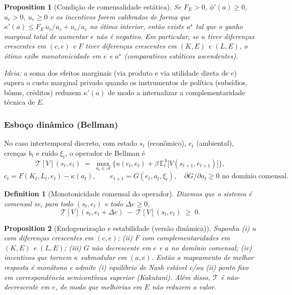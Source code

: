 \documentclass[a4paper,12pt,oneside,brazil,english]{abntex2}
\newtheorem{definition}{Definition}[section]
\newtheorem{proposition}{Proposition}[section]
\begin{document}
\begin{proposition}[Condição de comensalidade estática]
Se $F_E>0$, $\phi'(a)\ge 0$, $u_c>0$, $u_e\ge 0$ e os incentivos forem calibrados de forma que $\kappa'(a)\le F_E\,u_c/u_c + u_e/u_c$ no ótimo interior, então existe $a^\star$ tal que o ganho marginal total de aumentar $e$ não é negativo. Em particular, se $u$ tiver diferenças crescentes em $(c,e)$ e $F$ tiver diferenças crescentes em $(K,E)$ e $(L,E)$, o ótimo exibe \emph{monotonicidade} em $e$ e $a^\star$ (comparativos estáticos ascendentes).
\end{proposition}

\noindent
\textit{Ideia:} a soma dos efeitos marginais (via produto e via utilidade direta de $e$) supera o custo marginal privado quando os instrumentos de política (subsídios, bônus, créditos) reduzem $\kappa'(a)$ de modo a internalizar a complementaridade técnica de $E$.

\subsubsection*{Esboço dinâmico (Bellman)}

No caso intertemporal discreto, com estado $s_t$ (econômico), $e_t$ (ambiental), crenças $b_t$ e ruído $\xi_t$, o operador de Bellman é
\[
\mathcal{T}[V](s_t,e_t) \;=\; \max_{a_t\in\mathcal{A}} \Big\{ u(c_t,e_t) + \beta\,\mathbb{E}_{t}^{\,b}\big[V(s_{t+1},e_{t+1})\big] \Big\},
\]
\[
c_t=F(K_t,L_t,e_t)-\kappa(a_t),\qquad e_{t+1}=G(e_t,a_t,\xi_t),\quad \partial G/\partial a_t \ge 0 \text{ no domínio comensal}.
\]

\begin{definition}[Monotonicidade comensal do operador]
Dizemos que o sistema é \emph{comensal} se, para todo $(s_t,e_t)$ e todo $\Delta e\ge 0$,
\[
\mathcal{T}[V](s_t,e_t+\Delta e)\;-\;\mathcal{T}[V](s_t,e_t)\;\ge\;0.
\]
\end{definition}

\begin{proposition}[Endogeneização e estabilidade (versão dinâmica)]
Suponha (i) $u$ com diferenças crescentes em $(c,e)$; (ii) $F$ com complementaridades em $(K,E)$ e $(L,E)$; (iii) $G$ não decrescente em $e$ e $a$ no domínio comensal; (iv) incentivos que tornem $\kappa$ submodular em $(a,e)$. Então o mapeamento de melhor resposta é monótono e admite (i) equilíbrio de Nash estável e/ou (ii) ponto fixo em correspondência semicontínua superior (Kakutani). Além disso, $\mathcal{T}$ é não-decrescente em $e$, de modo que melhorias em $E$ não reduzem o valor.
\end{proposition}
\end{document}
